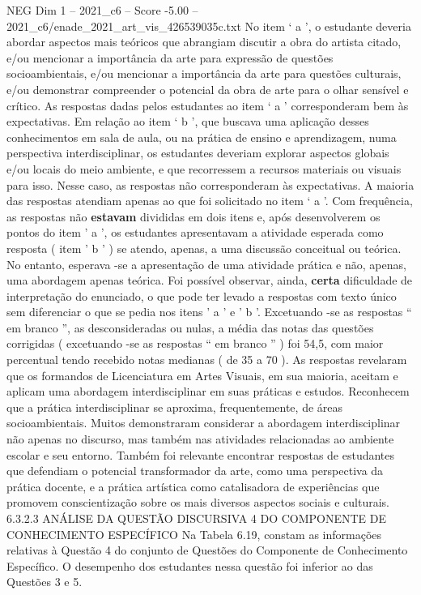 \begin{textsample}{NEG Dim 1 – 2021\_c6 – Score -5.00 – 2021\_c6/enade\_2021\_art\_vis\_426539035c.txt}
No item ‘ a ’, o estudante deveria abordar aspectos mais teóricos que abrangiam discutir a obra do artista citado, e/ou mencionar a importância da arte para expressão de questões socioambientais, e/ou mencionar a importância da arte para questões culturais, e/ou demonstrar compreender o potencial da obra de arte para o olhar sensível e crítico.
As respostas dadas pelos estudantes ao item ‘ a ’ corresponderam bem às expectativas.
Em relação ao item ‘ b ’, que buscava uma aplicação desses conhecimentos em sala de aula, ou na prática de ensino e aprendizagem, numa perspectiva interdisciplinar, os estudantes deveriam explorar aspectos globais e/ou locais do meio ambiente, e que recorressem a recursos materiais ou visuais para isso.
Nesse caso, as respostas não corresponderam às expectativas.
A maioria das respostas atendiam apenas ao que foi solicitado no item ‘ a ’.
Com frequência, as respostas não \textbf{estavam} divididas em dois itens e, após desenvolverem os pontos do item ' a ', os estudantes apresentavam a atividade esperada como resposta ( item ' b ' ) se atendo, apenas, a uma discussão conceitual ou teórica.
No entanto, esperava -se a apresentação de uma atividade prática e não, apenas, uma abordagem apenas teórica.
Foi possível observar, ainda, \textbf{certa} dificuldade de interpretação do enunciado, o que pode ter levado a respostas com texto único sem diferenciar o que se pedia nos itens ' a ' e ' b '.
Excetuando -se as respostas “ em branco ”, as desconsideradas ou nulas, a média das notas das questões corrigidas ( excetuando -se as respostas “ em branco ” ) foi 54,5, com maior percentual tendo recebido notas medianas ( de 35 a 70 ).
As respostas revelaram que os formandos de Licenciatura em Artes Visuais, em sua maioria, aceitam e aplicam uma abordagem interdisciplinar em suas práticas e estudos.
Reconhecem que a prática interdisciplinar se aproxima, frequentemente, de áreas socioambientais.
Muitos demonstraram considerar a abordagem interdisciplinar não apenas no discurso, mas também nas atividades relacionadas ao ambiente escolar e seu entorno.
Também foi relevante encontrar respostas de estudantes que defendiam o potencial transformador da arte, como uma perspectiva da prática docente, e a prática artística como catalisadora de experiências que promovem conscientização sobre os mais diversos aspectos sociais e culturais. 6.3.2.3 ANÁLISE DA QUESTÃO DISCURSIVA 4 DO COMPONENTE DE CONHECIMENTO ESPECÍFICO Na Tabela 6.19, constam as informações relativas à Questão 4 do conjunto de Questões do Componente de Conhecimento Específico.
O desempenho dos estudantes nessa questão foi inferior ao das Questões 3 e 5.

\end{textsample}
